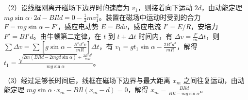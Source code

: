 \documentclass[\gkver]{gaokaozhenti}
\begin{document}
\begin{enumerate}
{	（2）设线框刚离开磁场下边界时的速度为 $v_{1}$，则接着向下运动 $2d$，由动能定理 $mg\sin\alpha\cdot2d-BIld=0-\frac{1}{2}mv_{1}^{2}$。装置在磁场中运动时受到的合力 $F=mg\sin\alpha-F'$，感应电动势 $E=Bdv$，感应电流 $I'=E/R$，安培力 $F'=BI'd$。由牛顿第二定律，在 $t$ 到 $t+\Delta t$ 时间内，有 $\Delta v=\frac{F}{m}\Delta t$，则 $\sum\Delta v=\sum\left[g\sin\alpha-\frac{B^{2}d^{2}v}{mR}\right]\Delta t$，有 $v_{1}=gt_{1}\sin\alpha-\frac{2B^{2}d^{3}}{mR}$，解得 $t_{1}=\frac{\sqrt{2m(BIld-2mgd\sin\alpha)}+\frac{2B^{2}d^{3}}{mR}}{mg\sin\alpha}$。

	（3）经过足够长时间后，线框在磁场下边界与最大距离 $x_{m}$ 之间往复运动，由动能定理 $mg\sin\alpha\cdot x_{m}-BIl(x_{m}-d)=0$，解得 $x_{m}=\frac{BIld}{BIl-mg\sin\alpha}$。
}

\end{enumerate}
\end{document}
